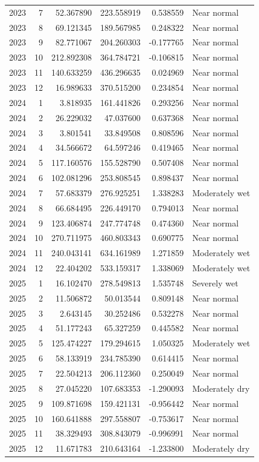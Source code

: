 \begin{tabular}{rrrrrl}
2023 & 7 & 52.367890 & 223.558919 & 0.538559 & Near normal \\
2023 & 8 & 69.121345 & 189.567985 & 0.248322 & Near normal \\
2023 & 9 & 82.771067 & 204.260303 & -0.177765 & Near normal \\
2023 & 10 & 212.892308 & 364.784721 & -0.106815 & Near normal \\
2023 & 11 & 140.633259 & 436.296635 & 0.024969 & Near normal \\
2023 & 12 & 16.989633 & 370.515200 & 0.234854 & Near normal \\
2024 & 1 & 3.818935 & 161.441826 & 0.293256 & Near normal \\
2024 & 2 & 26.229032 & 47.037600 & 0.637368 & Near normal \\
2024 & 3 & 3.801541 & 33.849508 & 0.808596 & Near normal \\
2024 & 4 & 34.566672 & 64.597246 & 0.419465 & Near normal \\
2024 & 5 & 117.160576 & 155.528790 & 0.507408 & Near normal \\
2024 & 6 & 102.081296 & 253.808545 & 0.898437 & Near normal \\
2024 & 7 & 57.683379 & 276.925251 & 1.338283 & Moderately wet \\
2024 & 8 & 66.684495 & 226.449170 & 0.794013 & Near normal \\
2024 & 9 & 123.406874 & 247.774748 & 0.474360 & Near normal \\
2024 & 10 & 270.711975 & 460.803343 & 0.690775 & Near normal \\
2024 & 11 & 240.043141 & 634.161989 & 1.271859 & Moderately wet \\
2024 & 12 & 22.404202 & 533.159317 & 1.338069 & Moderately wet \\
2025 & 1 & 16.102470 & 278.549813 & 1.535748 & Severely wet \\
2025 & 2 & 11.506872 & 50.013544 & 0.809148 & Near normal \\
2025 & 3 & 2.643145 & 30.252486 & 0.532278 & Near normal \\
2025 & 4 & 51.177243 & 65.327259 & 0.445582 & Near normal \\
2025 & 5 & 125.474227 & 179.294615 & 1.050325 & Moderately wet \\
2025 & 6 & 58.133919 & 234.785390 & 0.614415 & Near normal \\
2025 & 7 & 22.504213 & 206.112360 & 0.250049 & Near normal \\
2025 & 8 & 27.045220 & 107.683353 & -1.290093 & Moderately dry \\
2025 & 9 & 109.871698 & 159.421131 & -0.956442 & Near normal \\
2025 & 10 & 160.641888 & 297.558807 & -0.753617 & Near normal \\
2025 & 11 & 38.329493 & 308.843079 & -0.996991 & Near normal \\
2025 & 12 & 11.671783 & 210.643164 & -1.233800 & Moderately dry \\
\bottomrule
\end{tabular}
